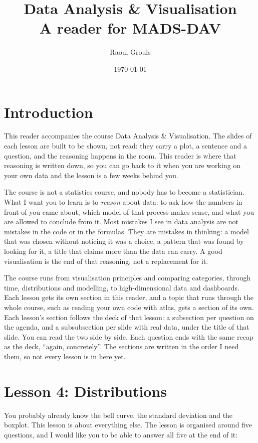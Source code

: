 \documentclass[12pt, a4paper]{article}
\title{Data Analysis \& Visualisation\\[0.3em]\large A reader for MADS-DAV}
\author{Raoul Grouls}
\date{\today}
\theoremstyle{definition}
\theoremstyle{remark}
\begin{document}
\maketitle
\tableofcontents
\newpage

\section{Introduction}
\label{sec:introduction}
This reader accompanies the course Data Analysis \& Visualisation. The slides of each lesson are built to be shown, not read: they carry a plot, a sentence and a question, and the reasoning happens in the room. This reader is where that reasoning is written down, so you can go back to it when you are working on your own data and the lesson is a few weeks behind you.

The course is not a statistics course, and nobody has to become a statistician. What I want you to learn is to \emph{reason} about data: to ask how the numbers in front of you came about, which model of that process makes sense, and what you are allowed to conclude from it. Most mistakes I see in data analysis are not mistakes in the code or in the formulas. They are mistakes in thinking: a model that was chosen without noticing it was a choice, a pattern that was found by looking for it, a title that claims more than the data can carry. A good visualisation is the end of that reasoning, not a replacement for it.

The course runs from visualisation principles and comparing categories, through time, distributions and modelling, to high-dimensional data and dashboards. Each lesson gets its own section in this reader, and a topic that runs through the whole course, such as reading your own code with atlas, gets a section of its own. Each lesson's section follows the deck of that lesson: a subsection per question on the agenda, and a subsubsection per slide with real data, under the title of that slide. You can read the two side by side. Each question ends with the same recap as the deck, ``again, concretely''. The sections are written in the order I need them, so not every lesson is in here yet.
\newpage

\section{Lesson 4: Distributions}
\label{sec:lesson4}
You probably already know the bell curve, the standard deviation and the boxplot. This lesson is about everything else. The lesson is organised around five questions, and I would like you to be able to answer all five at the end of it:
\end{document}
